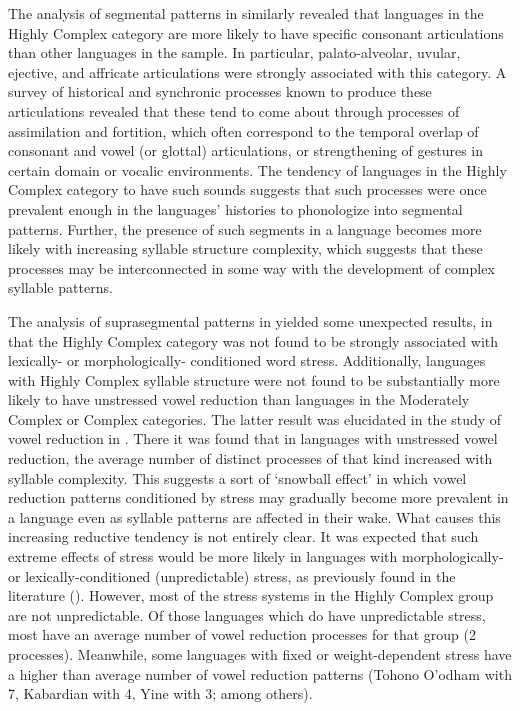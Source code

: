   The analysis of segmental patterns in  similarly revealed that languages in the Highly Complex category are more likely to have specific consonant articulations than other languages in the sample. In particular, palato-alveolar, uvular, ejective, and affricate articulations were strongly associated with this category. A survey of historical and synchronic processes known to produce these articulations revealed that these tend to come about through processes of assimilation and fortition, which often correspond to the temporal overlap of consonant and vowel (or glottal) articulations, or strengthening of gestures in certain domain or vocalic environments. The tendency of languages in the Highly Complex category to have such sounds suggests that such processes were once prevalent enough in the languages’ histories to phonologize into segmental patterns. Further, the presence of such segments in a language becomes more likely with increasing syllable structure complexity, which suggests that these processes may be interconnected in some way with the development of complex syllable patterns.

  The analysis of suprasegmental patterns in  yielded some unexpected results, in that the Highly Complex category was not found to be strongly associated with lexically- or morphologically- conditioned word stress. Additionally, languages with Highly Complex syllable structure were not found to be substantially more likely to have unstressed vowel reduction than languages in the Moderately Complex or Complex categories. The latter result was elucidated in the study of vowel reduction in . There it was found that in languages with unstressed vowel reduction, the average number of distinct processes of that kind increased with syllable complexity. This suggests a sort of ‘snowball effect’ in which vowel reduction patterns conditioned by stress may gradually become more prevalent in a language even as syllable patterns are affected in their wake. What causes this increasing reductive tendency is not entirely clear. It was expected that such extreme effects of stress would be more likely in languages with morphologically- or lexically-conditioned (unpredictable) stress, as previously found in the literature (\citealt{BybeeEtAl1998,Schiering2007}). However, most of the stress systems in the Highly Complex group are not unpredictable. Of those languages which do have unpredictable stress, most have an average number of vowel reduction processes for that group (2 processes). Meanwhile, some languages with fixed or weight-dependent stress have a higher than average number of vowel reduction patterns (Tohono O’odham with 7, Kabardian with 4, Yine with 3; among others). 

